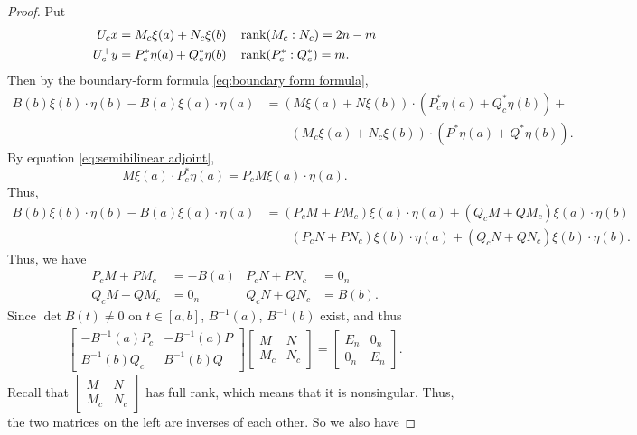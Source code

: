 \documentclass[12pt, oneside, a4paper]{article}
\begin{document}
\begin{proof}
    Put
    \begin{align*}
        U_cx &= M_c\xi(a) + N_c\xi(b)\quad \operatorname{rank}(M_c:N_c) = 2n-m\\
        U_c^+y &= P_c^*\eta(a) + Q_c^*\eta(b)\quad\operatorname{rank}(P_c^*:Q_c^*)=m.
    \end{align*}
    Then by the boundary-form formula \eqref{eq:boundary form formula},
    \begin{align*}
        B(b)\xi(b)\cdot \eta(b) - B(a)\xi(a)\cdot \eta(a) &= (M\xi(a) + N\xi(b))\cdot (P_c^*\eta(a) + Q_c^*\eta(b)) + \\
        &\qquad (M_c\xi(a) + N_c\xi(b))\cdot (P^*\eta(a) + Q^*\eta(b)).
    \end{align*}
    By equation \eqref{eq:semibilinear adjoint}, 
    \[M\xi(a)\cdot P_c^*\eta(a) = P_cM\xi(a)\cdot \eta(a).\]
    Thus,
    \begin{align*}
        B(b)\xi(b)\cdot \eta(b) - B(a)\xi(a)\cdot \eta(a) &= (P_c M + PM_c)\xi(a)\cdot \eta(a) + (Q_cM + QM_c)\xi(a)\cdot \eta(b) \\
        &\qquad (P_cN + PN_c) \xi(b)\cdot \eta(a) + (Q_cN + QN_c) \xi(b)\cdot \eta(b).
    \end{align*}
    Thus, we have
    \begin{align*}
        P_cM + PM_c &= - B(a) & P_cN + PN_c &= 0_n\\
        Q_cM + QM_c &= 0_n & Q_cN + QN_c &= B(b).
    \end{align*}
    Since $\det B(t)\neq 0$ on $t\in[a,b]$, $B^{-1}(a)$, $B^{-1}(b)$ exist, and thus
    \begin{align*}
        \begin{bmatrix}
            -B^{-1}(a)P_c & -B^{-1}(a)P\\
            B^{-1}(b)Q_c & B^{-1}(b)Q
        \end{bmatrix}
        \begin{bmatrix}
            M & N\\
            M_c & N_c
        \end{bmatrix}
        =
        \begin{bmatrix}
            E_n & 0_n\\
            0_n & E_n
        \end{bmatrix}.
    \end{align*}
    Recall that $\begin{bmatrix}
        M & N\\
        M_c & N_c
    \end{bmatrix}$ has full rank, which means that it is nonsingular. Thus, the two matrices on the left are inverses of each other. So we also have

\end{proof}
\end{document}
